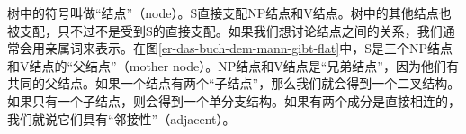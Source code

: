 树中的符号叫做“结点”（node）。S直接支配NP结点和V结点。树中的其他结点也被支配，只不过不是受到S的直接支配。如果我们想讨论结点之间的关系，我们通常会用亲属词来表示。在图\ref{er-das-buch-dem-mann-gibt-flat}中，S是三个NP结点和V结点的“父结点”（mother
node）。NP结点和V结点是“兄弟结点”，因为他们有共同的父结点。如果一个结点有两个“子结点”，那么我们就会得到一个二叉结构。如果只有一个子结点，则会得到一个单分支结构。如果有两个成分是直接相连的，我们就说它们具有“邻接性”（adjacent）。

